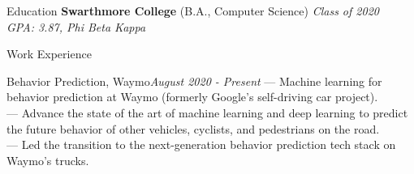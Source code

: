 \documentclass{resume} %
\begin{document}

\begin{rSection}{Education}
	{ \textbf{Swarthmore College} (B.A., Computer Science)} \hfill {\em Class of 2020} \\
	\null \hfill {\em GPA: 3.87, Phi Beta Kappa}
\end{rSection}

\begin{rSection}{Work Experience}
	{
		\begin{rSubsection}{Behavior Prediction,  Waymo}{\em August 2020 - Present}{}{}
			--- Machine learning for behavior prediction at Waymo (formerly Google's self-driving car project). \\
			--- Advance the state of the art of machine learning and deep learning to predict the future behavior of other vehicles, cyclists, and pedestrians on the road. \\
			--- Led the transition to the next-generation behavior prediction tech stack on Waymo's trucks.
		\end{rSubsection}
	}
\end{rSection}  %
\end{document}
